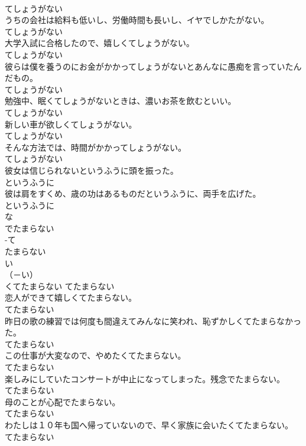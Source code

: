 \documentclass[8pt]{extreport}
\begin{document}
\begin{CJK}{UTF8}{min}
\\	てしょうがない
\\	うちの会社は給料も低いし、労働時間も長いし、イヤでしかたがない。	
\\	てしょうがない
\\	大学入試に合格したので、嬉しくてしょうがない。	
\\	てしょうがない
\\	彼らは僕を養うのにお金がかかってしょうがないとあんなに愚痴を言っていたんだもの。	
\\	てしょうがない
\\	勉強中、眠くてしょうがないときは、濃いお茶を飲むといい。	
\\	てしょうがない
\\	新しい車が欲しくてしょうがない。	
\\	てしょうがない
\\	そんな方法では、時間がかかってしょうがない。	
\\	てしょうがない
\\	彼女は信じられないというふうに頭を振った。	
\\	というふうに
\\	彼は肩をすくめ、歳の功はあるものだというふうに、両手を広げた。	
\\	というふうに
\\	な
\\	でたまらない	
\\	-て
\\	たまらない	
\\	い
\\	（－い） 
\\	くてたまらない	てたまらない
\\	恋人ができて嬉しくてたまらない。	
\\	てたまらない
\\	昨日の歌の練習では何度も間違えてみんなに笑われ、恥ずかしくてたまらなかった。	
\\	てたまらない
\\	この仕事が大変なので、やめたくてたまらない。	
\\	てたまらない
\\	楽しみにしていたコンサートが中止になってしまった。残念でたまらない。	
\\	てたまらない
\\	母のことが心配でたまらない。	
\\	てたまらない
\\	わたしは１０年も国へ帰っていないので、早く家族に会いたくてたまらない。	
\\	てたまらない

\end{CJK}
\end{document}
